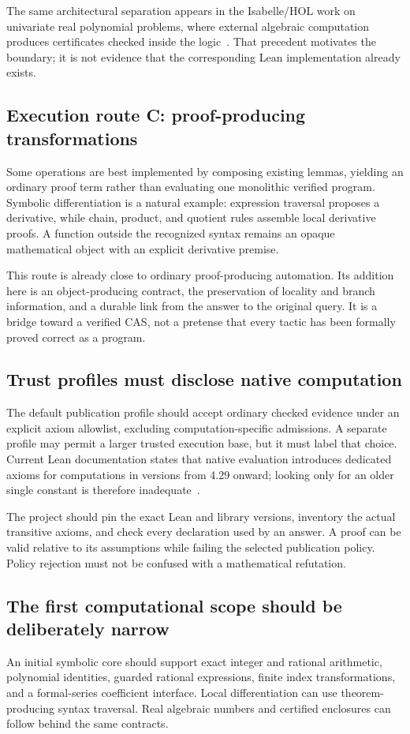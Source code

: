\documentclass[11pt,a4paper]{article}
\theoremstyle{definition}
\begin{document}
The same architectural separation appears in the Isabelle/HOL work on univariate real polynomial problems, where external algebraic computation produces certificates checked inside the logic~\cite{univariate}. That precedent motivates the boundary; it is not evidence that the corresponding Lean implementation already exists.

\subsection{Execution route C: proof-producing transformations}
Some operations are best implemented by composing existing lemmas, yielding an ordinary proof term rather than evaluating one monolithic verified program. Symbolic differentiation is a natural example: expression traversal proposes a derivative, while chain, product, and quotient rules assemble local derivative proofs. A function outside the recognized syntax remains an opaque mathematical object with an explicit derivative premise.

This route is already close to ordinary proof-producing automation. Its addition here is an object-producing contract, the preservation of locality and branch information, and a durable link from the answer to the original query. It is a bridge toward a verified CAS, not a pretense that every tactic has been formally proved correct as a program.

\subsection{Trust profiles must disclose native computation}
The default publication profile should accept ordinary checked evidence under an explicit axiom allowlist, excluding computation-specific admissions. A separate profile may permit a larger trusted execution base, but it must label that choice. Current Lean documentation states that native evaluation introduces dedicated axioms for computations in versions from 4.29 onward; looking only for an older single constant is therefore inadequate~\cite{leanvalidate}.

The project should pin the exact Lean and library versions, inventory the actual transitive axioms, and check every declaration used by an answer. A proof can be valid relative to its assumptions while failing the selected publication policy. Policy rejection must not be confused with a mathematical refutation.

\subsection{The first computational scope should be deliberately narrow}
An initial symbolic core should support exact integer and rational arithmetic, polynomial identities, guarded rational expressions, finite index transformations, and a formal-series coefficient interface. Local differentiation can use theorem-producing syntax traversal. Real algebraic numbers and certified enclosures can follow behind the same contracts.
\end{document}
